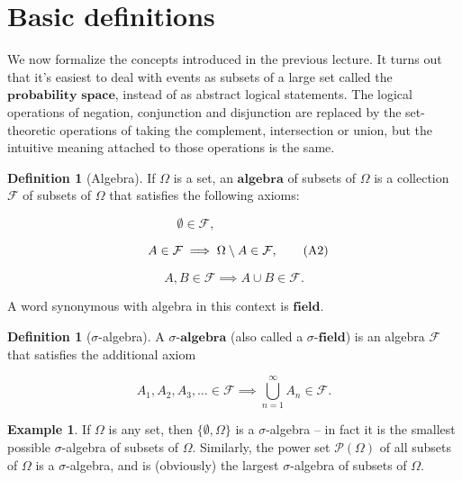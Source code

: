 \documentclass[11pt]{report}
\providecommand{\cal}{\mathcal}
\theoremstyle{plain}
\theoremstyle{definition}
\newtheorem{defn}[thm]{Definition}
\newtheorem{example}[thm]{Example}
\begin{document}
\section{Basic definitions}
\label{basic-def}

We now formalize the concepts introduced in the
previous lecture. It turns out that it's easiest to
deal with events as subsets of a large set called the
$\textbf{probability space}$, instead of as abstract
logical statements. The logical operations of
negation, conjunction and disjunction are replaced by
the set-theoretic operations of taking the complement,
intersection or union, but the intuitive meaning
attached to those operations is the same.

\begin{defn}[Algebra]
If $\Omega$ is a set, an $\textbf{algebra}$ of
subsets of $\Omega$ is a collection ${\cal F}$ of
subsets of $\Omega$ that satisfies the following
axioms:

\begin{equation*}
\emptyset \in {\cal F},  \tag{A1}\qquad\qquad\qquad
\end{equation*}

\begin{equation*}
 \ \ A \in {\cal F} \implies \Omega\setminus A \in {\cal F}, \tag{A2} \\
\end{equation*}

\begin{equation*}
A,B \in {\cal F} \implies A\cup B \in {\cal F}.  \tag{A3}
\end{equation*}

\noindent A word synonymous with algebra in this context is
$\textbf{field}$.
\end{defn}

\begin{defn}[$\sigma$-algebra]
A  $\textbf{$\sigma$-algebra}$ (also called a
$\textbf{$\sigma$-field}$) is an algebra ${\cal F}$
that satisfies the additional axiom

\begin{equation*}
A_1, A_2, A_3, \ldots \in \mathcal{F}
\implies
\bigcup_{n=1}^{\infty} A_n \in \mathcal{F}.
\tag{A4}
\end{equation*}

\end{defn}

\begin{example}
If $\Omega$ is any set, then $\{ \emptyset, \Omega \}$
is a $\sigma$-algebra -- in fact it is the smallest
possible $\sigma$-algebra of subsets of $\Omega$.
Similarly, the power set ${\cal P}(\Omega)$ of all
subsets of $\Omega$ is a $\sigma$-algebra, and is
(obviously) the largest $\sigma$-algebra of subsets
of $\Omega$.
\end{example}
\end{document}
